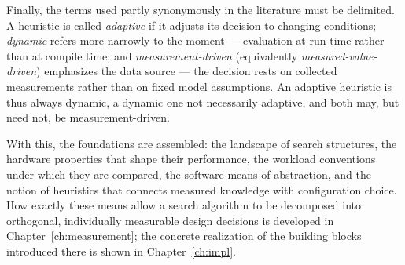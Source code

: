 Finally, the terms used partly synonymously in the literature must be delimited\@. A heuristic is
called \emph{adaptive} if it adjusts its decision to changing conditions; \emph{dynamic} refers more
narrowly to the moment --- evaluation at run time rather than at compile time; and
\emph{measurement-driven} (equivalently \emph{measured-value-driven}) emphasizes the data source --- the decision rests on collected measurements
rather than on fixed model assumptions. An adaptive heuristic is thus always dynamic, a dynamic one
not necessarily adaptive, and both may, but need not, be measurement-driven.

\begin{nurlang}
With this, the foundations are assembled: the landscape of search structures, the hardware properties
that shape their performance, the workload conventions under which they are compared, the software
means of abstraction, and the notion of heuristics that connects measured knowledge with configuration
choice. How exactly these means allow a search algorithm to be decomposed into orthogonal, individually
measurable design decisions is developed in Chapter~\ref{ch:measurement}; the concrete realization of
the building blocks introduced there is shown in Chapter~\ref{ch:impl}.
\end{nurlang}

